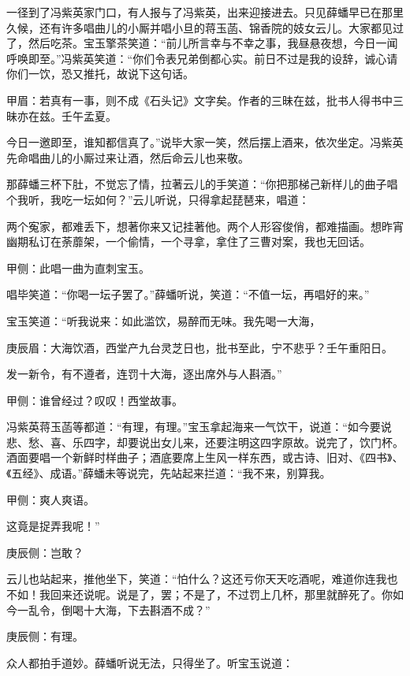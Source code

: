 \begin{parag}
    一径到了冯紫英家门口，有人报与了冯紫英，出来迎接进去。只见薛蟠早已在那里久候，还有许多唱曲儿的小厮并唱小旦的蒋玉菡、锦香院的妓女云儿。大家都见过了，然后吃茶。宝玉擎茶笑道：“前儿所言幸与不幸之事，我昼悬夜想，今日一闻呼唤即至。”冯紫英笑道：“你们令表兄弟倒都心实。前日不过是我的设辞，诚心请你们一饮，恐又推托，故说下这句话。\begin{note}甲眉：若真有一事，则不成《石头记》文字矣。作者的三昧在兹，批书人得书中三昧亦在兹。壬午孟夏。\end{note}今日一邀即至，谁知都信真了。”说毕大家一笑，然后摆上酒来，依次坐定。冯紫英先命唱曲儿的小厮过来让酒，然后命云儿也来敬。
\end{parag}


\begin{parag}
    那薛蟠三杯下肚，不觉忘了情，拉著云儿的手笑道：“你把那梯己新样儿的曲子唱个我听，我吃一坛如何？”云儿听说，只得拿起琵琶来，唱道：
\end{parag}


\begin{parag}
    两个寃家，都难丢下，想著你来又记挂著他。两个人形容俊俏，都难描画。想昨宵幽期私订在荼蘼架，一个偷情，一个寻拿，拿住了三曹对案，我也无回话。\begin{note}甲侧：此唱一曲为直刺宝玉。\end{note}
\end{parag}


\begin{parag}
    唱毕笑道：“你喝一坛子罢了。”薛蟠听说，笑道：“不值一坛，再唱好的来。”
\end{parag}


\begin{parag}
    宝玉笑道：“听我说来：如此滥饮，易醉而无味。我先喝一大海，\begin{note}庚辰眉：大海饮酒，西堂产九台灵芝日也，批书至此，宁不悲乎？壬午重阳日。\end{note}发一新令，有不遵者，连罚十大海，逐出席外与人斟酒。”\begin{note}甲侧：谁曾经过？叹叹！西堂故事。\end{note}冯紫英蒋玉菡等都道：“有理，有理。”宝玉拿起海来一气饮干，说道：“如今要说悲、愁、喜、乐四字，却要说出女儿来，还要注明这四字原故。说完了，饮门杯。酒面要唱一个新鲜时样曲子；酒底要席上生风一样东西，或古诗、旧对、《四书》、《五经》、成语。”薛蟠未等说完，先站起来拦道：“我不来，别算我。\begin{note}甲侧：爽人爽语。\end{note}这竟是捉弄我呢！”\begin{note}庚辰侧：岂敢？\end{note}云儿也站起来，推他坐下，笑道：“怕什么？这还亏你天天吃酒呢，难道你连我也不如！我回来还说呢。说是了，罢；不是了，不过罚上几杯，那里就醉死了。你如今一乱令，倒喝十大海，下去斟酒不成？”\begin{note}庚辰侧：有理。\end{note}众人都拍手道妙。薛蟠听说无法，只得坐了。听宝玉说道：
\end{parag}


